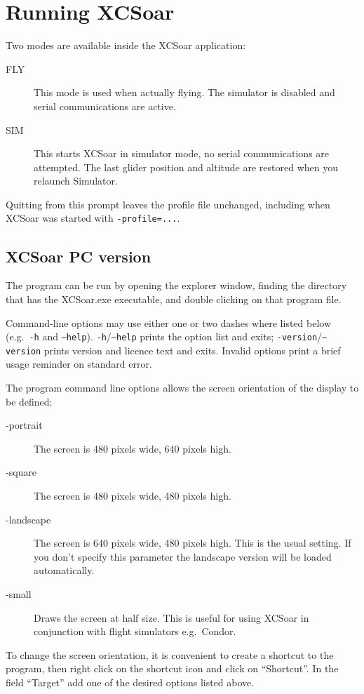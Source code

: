 \section{Running XCSoar}

Two modes are available inside the XCSoar application: 
\begin{description}
\item[FLY] This mode is used when actually flying.  The simulator is 
  disabled and serial communications are active. 
\item[SIM] This starts XCSoar in simulator mode, no serial communications
  are attempted.  The last glider position and altitude are restored
  when you relaunch Simulator.
\end{description}
Quitting from this prompt leaves the profile file unchanged, including
when XCSoar was started with \verb|-profile=...|.

\subsection*{XCSoar PC version}
The program can be run by opening the explorer window, finding the directory
that has the XCSoar.exe executable, and double clicking on that program file.

Command-line options may use either one or two dashes where listed below (e.g.\
\texttt{-h} and \texttt{--help}).
\texttt{-h}/\texttt{--help} prints the option list and exits;
\texttt{-version}/\texttt{--version} prints version and licence text and exits.
Invalid options print a brief usage reminder on standard error.

The program command line options allows the screen orientation of
the display to be defined:
\begin{description}
\item[-portrait] The screen is 480 pixels wide, 640 pixels high.
\item[-square] The screen is 480 pixels wide, 480 pixels high.
\item[-landscape] The screen is 640 pixels wide, 480 pixels high. This is the
usual setting. If you don't specify this parameter the landscape version will be
loaded automatically.
\item[-small] Draws the screen at half size.  This is useful for using XCSoar in
 conjunction with flight simulators e.g.\ Condor.
\end{description}
To change the screen orientation, it is convenient to create a shortcut to the
program, then right click on the shortcut icon and click on ``Shortcut''. 
In the field ``Target'' add one of the desired options listed above.

